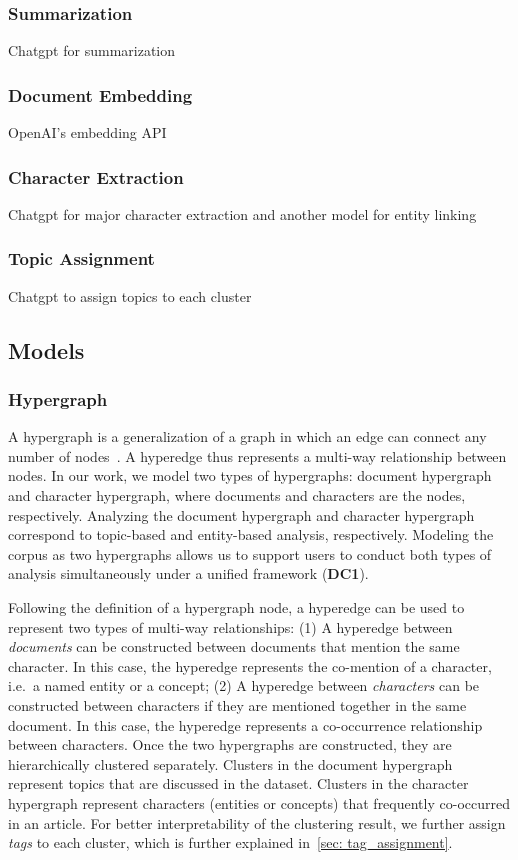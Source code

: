 \subsubsection{Summarization}
Chatgpt for summarization
\subsubsection{Document Embedding}\label{sec: embeddings}
OpenAI's embedding API
\subsubsection{Character Extraction}\label{sec: character_extraction}
Chatgpt for major character extraction and another model for entity linking

\subsubsection{Topic Assignment}\label{sec: tag_assignment}
Chatgpt to assign topics to each cluster
~\cite{raval2023explainandtrust}
\subsection{Models}
\subsubsection{Hypergraph}
A hypergraph is a generalization of a graph in which an edge can connect any number of nodes~\cite{fischer2021hypergraphsurvey}.
A hyperedge thus represents a multi-way relationship between nodes.
In our work, we model two types of hypergraphs: document hypergraph and character hypergraph, where documents and characters are the nodes, respectively.
Analyzing the document hypergraph and character hypergraph correspond to topic-based and entity-based analysis, respectively.
Modeling the corpus as two hypergraphs allows us to support users to conduct both types of analysis simultaneously under a unified framework (\textbf{DC1}).

Following the definition of a hypergraph node, a hyperedge can be used to represent two types of multi-way relationships:
(1) A hyperedge between \textit{documents} can be constructed between documents that mention the same character. 
In this case, the hyperedge represents the co-mention of a character, i.e.\ a named entity or a concept;
(2) A hyperedge between \textit{characters} can be constructed between characters if they are mentioned together in the same document.
In this case, the hyperedge represents a co-occurrence relationship between characters.
Once the two hypergraphs are constructed, they are hierarchically clustered separately.
Clusters in the document hypergraph represent topics that are discussed in the dataset.
Clusters in the character hypergraph represent characters (entities or concepts) that frequently co-occurred in an article.
For better interpretability of the clustering result, we further assign \textit{tags} to each cluster, which is further explained in~\autoref{sec: tag_assignment}.

